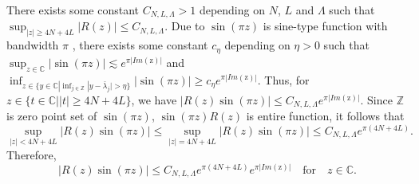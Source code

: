 \documentclass[a4paper]{article}
\numberwithin{equation}{section}
\begin{document}
 There exists some constant $C_{N,L,\Lambda}>1$ depending on $N$, $L$ and $\Lambda$ such that $\sup_{|z| \ge 4N+4L}|R(z)|\le C_{N,L,\Lambda}$. 
Due to $\sin(\pi z)$ is sine-type function with bandwidth $\pi$ , there exists some constant $c_{\eta}$ depending on $\eta>0$ such that $\sup_{z\in\mathbb{C}}|\sin(\pi z)| \lesssim e^{\pi|Im(\mathrm z)|}$ and  $\inf_{z\in\{y\in\mathbb{C}|\inf_{j\in\mathbb{Z}}|y-\bar{\lambda}_{j}|>\eta\}}|\sin(\pi z)| \ge c_{\eta} e^{\pi|Im(\mathrm z)|}$. Thus, for $z\in \{t\in\mathbb{C}||t|\ge 4N+4L\}$, we have $ |R(z)\sin(\pi z)|\le C_{N,L,\Lambda} e^{\pi|Im(\mathrm z)|} $. Since $\mathbb{Z}$ is zero point set of $\sin(\pi z)$, $\sin(\pi z)R(z)$ is entire function, it follows that
$$ \sup_{|z|<4N+4L}|R(z)\sin(\pi z)|\le \sup_{|z| = 4N+4L}|R(z)\sin(\pi z)|\le C_{N,L,\Lambda} e^{\pi(4N+4L)}  .$$
Therefore, $$ |R(z)\sin(\pi z)|\le C_{N,L,\Lambda} e^{\pi(4N+4L)}e^{\pi|Im(\mathrm z)|} \quad \text{for} \quad z\in\mathbb{C}.$$
\end{document}
